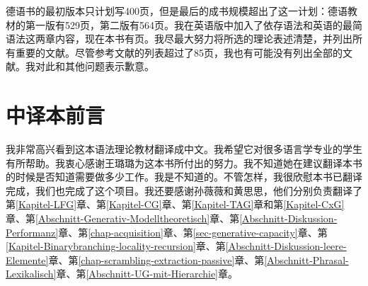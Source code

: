 德语书的最初版本只计划写400页，但是最后的成书规模超出了这一计划：德语教材的第一版有529页，第二版有564页。我在英语版中加入了依存语法和英语的最简语法这两章内容，现在本书有\pageref{LastPage}页。我尽最大努力将所选的理论表述清楚，并列出所有重要的文献。尽管参考文献的列表超过了85页，我也有可能没有列出全部的文献。我对此和其他问题表示歉意。

%





\section*{中译本前言}

我非常高兴看到这本语法理论教材翻译成中文。我希望它对很多语言学专业的学生有所帮助。我衷心感谢王璐璐为这本书所付出的努力。我不知道她在建议翻译本书的时候是否知道需要做多少工作。我是不知道的。不管怎样，我很欣慰本书已翻译完成，我们也完成了这个项目。我还要感谢孙薇薇和黄思思，他们分别负责翻译了第\ref{Kapitel-LFG}章、第\ref{Kapitel-CG}章、第\ref{Kapitel-TAG}章和第\ref{Kapitel-CxG}章、第\ref{Abschnitt-Generativ-Modelltheoretisch}章、第\ref{Abschnitt-Diskussion-Performanz}章、第\ref{chap-acquisition}章、第\ref{sec-generative-capacity}章、第\ref{Kapitel-Binarybranching-locality-recursion}章、第\ref{Abschnitt-Diskussion-leere-Elemente}章、第\ref{chap-scrambling-extraction-passive}章、第\ref{Abschnitt-Phrasal-Lexikalisch}章、第\ref{Abschnitt-UG-mit-Hierarchie}章。

